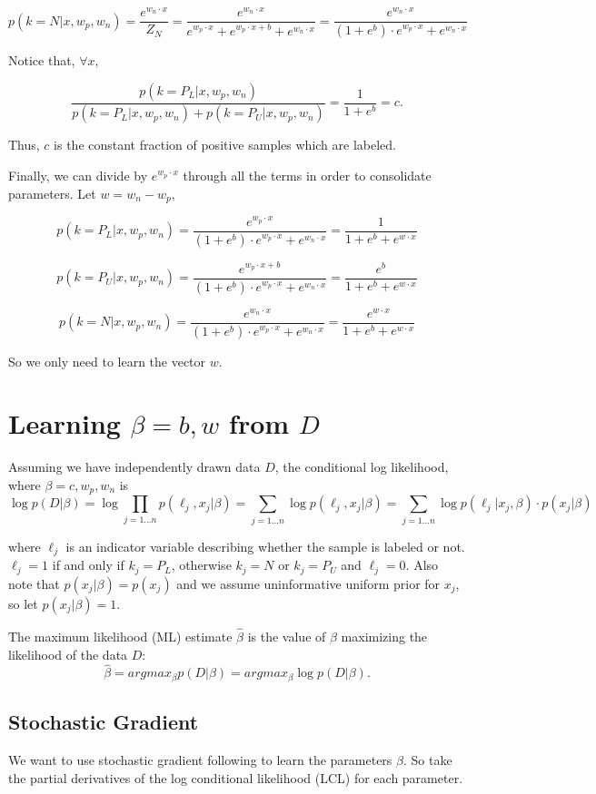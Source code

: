 \documentclass{article}
\begin{document}
$$
p(k=N | x, w_p, w_n) =  \frac{e^{w_n \cdot x}}{Z_N} = \frac{e^{w_n \cdot x}}{e^{w_p \cdot x} + e^{w_p \cdot x + b} + e^{w_n \cdot x}} = \frac{e^{w_n \cdot x}}{(1 + e^{b}) \cdot e^{w_p \cdot x} + e^{w_n \cdot x}}
$$

Notice that, $\forall x$,

$$
\frac{p(k=P_L | x, w_p, w_n)}{p(k=P_L | x, w_p, w_n) + p(k=P_U | x, w_p, w_n)} = \frac{1}{1 + e^b} = c.
$$

Thus, $c$ is the constant fraction of positive samples which are labeled.

Finally, we can divide by $e^{w_p \cdot x}$ through all the terms in order to consolidate parameters. Let $w = w_n - w_p$,

$$
p(k=P_L | x, w_p, w_n) = \frac{e^{w_p \cdot x}}{(1 + e^{b}) \cdot e^{w_p \cdot x} + e^{w_n \cdot x}} = \frac{1}{1 + e^b + e^{w \cdot x}}
$$

$$
p(k=P_U | x, w_p, w_n) = \frac{e^{w_p \cdot x + b}}{(1 + e^{b}) \cdot e^{w_p \cdot x} + e^{w_n \cdot x}} = \frac{e^b}{1 + e^b + e^{w \cdot x}}
$$

$$
p(k=N | x, w_p, w_n) = \frac{e^{w_n \cdot x}}{(1 + e^{b}) \cdot e^{w_p \cdot x} + e^{w_n \cdot x}} = \frac{e^{w \cdot x}}{1 + e^b + e^{w \cdot x}}
$$

So we only need to learn the vector $w$.

\section{Learning $\beta = b, w$ from $D$}

Assuming we have independently drawn data $D$, the conditional log likelihood, where $\beta = c, w_p, w_n$ is
$$
\log{p(D | \beta)} = \log \prod_{j=1...n}{p(\ell_j, x_j | \beta)} = \sum_{j=1...n}{\log{p(\ell_j, x_j | \beta)}} = \sum_{j=1...n}{\log{p(\ell_j | x_j, \beta)}} \cdot p(x_j | \beta)
$$

where $\ell_j$ is an indicator variable describing whether the sample is labeled or not. $\ell_j = 1$ if and only if $k_j=P_L$, otherwise $k_j = N$ or $k_j=P_U$ and $\ell_j = 0$.  Also note that $p(x_j|\beta) = p(x_j)$ and we assume uninformative uniform prior for $x_j$, so let $p(x_j|\beta) = 1$.

The maximum likelihood (ML) estimate $\hat \beta$ is the value of $\beta$ maximizing the likelihood of the data $D$:
$$
\hat \beta = arg max_{\beta} p(D | \beta) = arg max_{\beta} \log{p(D | \beta)}.
$$

\subsection{Stochastic Gradient}
We want to use stochastic gradient following to learn the parameters $\beta$. So take the partial derivatives of the log conditional likelihood (LCL) for each parameter.
\end{document}
